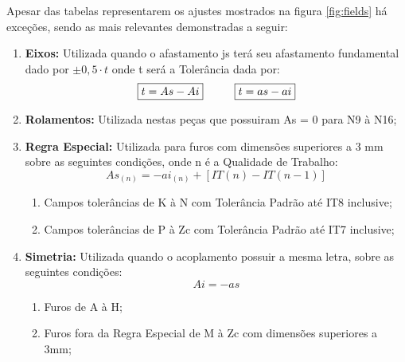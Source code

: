 \documentclass{article}
\begin{document}
            Apesar das tabelas representarem os ajustes mostrados na figura \ref{fig:fields} há exceções, sendo as mais relevantes demonstradas a seguir:
                \begin{enumerate}
                    \item \textbf{Eixos:} Utilizada quando o afastamento js terá seu afastamento fundamental dado por $\pm 0,5 \cdot t$ onde t será a Tolerância dada por:
                        \begin{equation}
                            \boxed{
                                t = As - Ai
                            }
                            \hspace{10mm}
                            \boxed{
                                t = as - ai
                            }
                        \end{equation}
                    \item \textbf{Rolamentos:} Utilizada nestas peças que possuiram As = 0 para N9 à N16;
                    \item \textbf{Regra Especial:} Utilizada para furos com dimensões superiores a 3 mm sobre as seguintes condições, onde n é a Qualidade de Trabalho:
                        \begin{equation}
                            \boxed{
                                As_{(n)} = - ai_{(n)} + [ IT(n) - IT(n-1) ]
                            }
                        \end{equation}
                        \begin{enumerate}[noitemsep]
                            \item Campos tolerâncias de K à N com Tolerância Padrão até IT8 inclusive; 
                            \item Campos tolerâncias de P à Zc com Tolerância Padrão até IT7 inclusive; 
                        \end{enumerate}
                    \item \textbf{Simetria:} Utilizada quando o acoplamento possuir a mesma letra, sobre as seguintes condições:
                        \begin{equation}
                            \boxed{
                                Ai = - as
                            }
                        \end{equation}
                        \begin{enumerate}[noitemsep]
                            \item Furos de A à H; 
                            \item Furos fora da Regra Especial de M à Zc com dimensões superiores a 3mm; 
                        \end{enumerate}
                \end{enumerate}
\newpage
\end{document}
